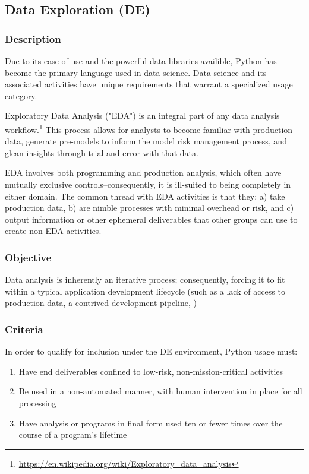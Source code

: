 
	\subsection{Data Exploration (DE)}

		\subsubsection{Description}

			Due to its ease-of-use and the powerful data libraries availible, Python has become the primary language used in data science. Data science and its associated activities have unique requirements that warrant a specialized usage category. 

			Exploratory Data Analysis ("EDA") is an integral part of any data analysis workflow.\footnote{\url{https://en.wikipedia.org/wiki/Exploratory_data_analysis}} This process allows for analysts to become familiar with production data, generate pre-models to inform the model risk management process, and glean insights through trial and error with that data. 

			EDA involves both programming and production analysis, which often have mutually exclusive controls--consequently, it is ill-suited to being completely in either domain. The common thread with EDA activities is that they: a) take production data, b) are nimble processes with minimal overhead or risk, and c) output information or other ephemeral deliverables that other groups can use to create non-EDA activities.

		\subsubsection{Objective}

			Data analysis is inherently an iterative process; consequently, forcing it to fit within a typical application development lifecycle (such as a lack of access to production data, a contrived development pipeline, )

		\subsubsection{Criteria}

			In order to qualify for inclusion under the DE environment, Python usage must:

			\begin{enumerate}
        		\item Have end deliverables confined to low-risk, non-mission-critical activities
        		\item Be used in a non-automated manner, with human intervention in place for all processing
        		\item Have analysis or programs in final form used ten or fewer times over the course of a program's lifetime
        	\end{enumerate}

